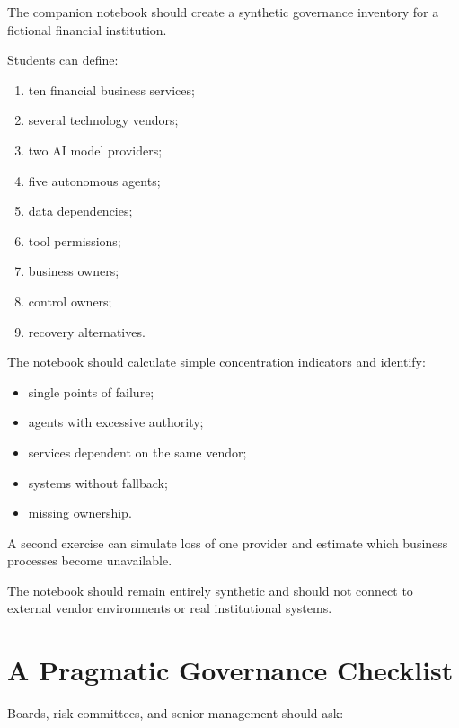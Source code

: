 \begin{notebooklab}
The companion notebook should create a synthetic governance inventory for a fictional financial institution.

Students can define:
\begin{enumerate}
    \item ten financial business services;
    \item several technology vendors;
    \item two AI model providers;
    \item five autonomous agents;
    \item data dependencies;
    \item tool permissions;
    \item business owners;
    \item control owners;
    \item recovery alternatives.
\end{enumerate}

The notebook should calculate simple concentration indicators and identify:
\begin{itemize}
    \item single points of failure;
    \item agents with excessive authority;
    \item services dependent on the same vendor;
    \item systems without fallback;
    \item missing ownership.
\end{itemize}

A second exercise can simulate loss of one provider and estimate which business processes become unavailable.

The notebook should remain entirely synthetic and should not connect to external vendor environments or real institutional systems.
\end{notebooklab}

\section{A Pragmatic Governance Checklist}

Boards, risk committees, and senior management should ask:

